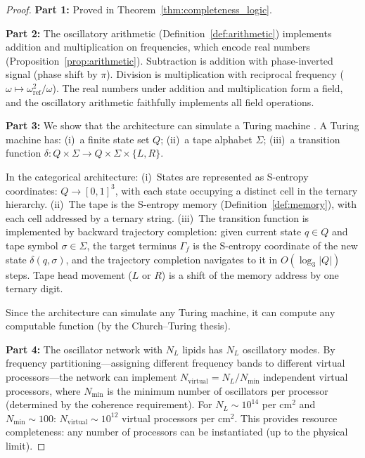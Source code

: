 \documentclass[twocolumn,10pt]{article}
\theoremstyle{remark}
\begin{document}
\begin{proof}
\textbf{Part 1:} Proved in Theorem~\ref{thm:completeness_logic}.

\textbf{Part 2:} The oscillatory arithmetic (Definition~\ref{def:arithmetic}) implements addition and multiplication on frequencies, which encode real numbers (Proposition~\ref{prop:arithmetic}). Subtraction is addition with phase-inverted signal (phase shift by $\pi$). Division is multiplication with reciprocal frequency ($\omega \mapsto \omega_{\mathrm{ref}}^2 / \omega$). The real numbers under addition and multiplication form a field, and the oscillatory arithmetic faithfully implements all field operations.

\textbf{Part 3:} We show that the architecture can simulate a Turing machine \cite{turing1936}. A Turing machine has: (i)~a finite state set $Q$; (ii)~a tape alphabet $\Sigma$; (iii)~a transition function $\delta: Q \times \Sigma \to Q \times \Sigma \times \{L, R\}$.

In the categorical architecture: (i)~States are represented as S-entropy coordinates: $Q \to [0,1]^3$, with each state occupying a distinct cell in the ternary hierarchy. (ii)~The tape is the S-entropy memory (Definition~\ref{def:memory}), with each cell addressed by a ternary string. (iii)~The transition function is implemented by backward trajectory completion: given current state $q \in Q$ and tape symbol $\sigma \in \Sigma$, the target terminus $\Gamma_f$ is the S-entropy coordinate of the new state $\delta(q, \sigma)$, and the trajectory completion navigates to it in $O(\log_3 |Q|)$ steps. Tape head movement ($L$ or $R$) is a shift of the memory address by one ternary digit.

Since the architecture can simulate any Turing machine, it can compute any computable function (by the Church--Turing thesis).

\textbf{Part 4:} The oscillator network with $N_L$ lipids has $N_L$ oscillatory modes. By frequency partitioning---assigning different frequency bands to different virtual processors---the network can implement $N_{\mathrm{virtual}} = N_L / N_{\mathrm{min}}$ independent virtual processors, where $N_{\mathrm{min}}$ is the minimum number of oscillators per processor (determined by the coherence requirement). For $N_L \sim 10^{14}$ per $\mathrm{cm}^2$ and $N_{\mathrm{min}} \sim 100$: $N_{\mathrm{virtual}} \sim 10^{12}$ virtual processors per $\mathrm{cm}^2$. This provides resource completeness: any number of processors can be instantiated (up to the physical limit).
\end{proof}
\end{document}
